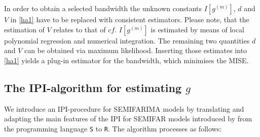 \documentclass[12pt]{article}
\begin{document}
In order to obtain a selected bandwidth the unknown constants $I[g^{(m)}]$, $d$ and $V$ in \eqref{ha1} have to be replaced with consistent estimators. Please note, that the estimation of $V$ relates to that of $cf$. $I[g^{(m)}]$ is estimated by means of local polynomial regression and numerical integration. The remaining two quantities $d$ and $V$ can be obtained via maximum likelihood. Inserting those estimates into \eqref{ha1} yields a plug-in estimator for the bandwidth, which minimises the MISE.

\subsection{The IPI-algorithm for estimating $g$}

We introduce an IPI-procedure for SEMIFARIMA models by translating and adapting the main features of the IPI for SEMIFAR models introduced by \citet{beran2002iterative} from the programming language \texttt{S} to \texttt{R}. The algorithm processes as follows:
\end{document}
